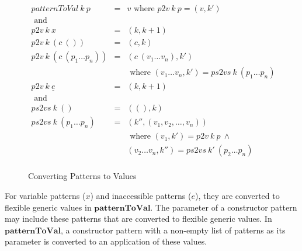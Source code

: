 \documentclass[acmsmall]{acmart}
\begin{document}
\begin{figure}[H]
  \begin{equation*}
    \begin{aligned}
      patternToVal \: k \: p             & = & v \textrm{ where } p2v \: k \: p = (v,k')                           \\
      \textrm{ and }                     &   &                                                                     \\
      p2v \: k \: x                      & = & (k,k+1)                                                             \\
      p2v \: k \: (c \: ())              & = & (c,k)                                                               \\
      p2v \: k \: (c \: (p_1 \dots p_n)) & = & (c \: (v_1 \dots v_n),k')                                           \\ 
                                         &   & \textrm{ where } (v_1 \dots v_n,k') = ps2vs \: k \: (p_1 \dots p_n) \\
      p2v \: k \: \underline{e}          & = & (k,k+1)                                                             \\
      \textrm{ and }                     &   &                                                                     \\
      ps2vs \: k \: ()                   & = & ((),k)                                                              \\
      ps2vs \: k \: (p_1 \dots p_n)      & = & (k'',(v_1,v_2,\dots,v_n))                                           \\
                                         &   & \textrm{ where } (v_1,k') = p2v \: k \: p \: \land                  \\
                                         &   & (v_2 \dots v_n,k'') = ps2vs \: k' \: (p_2 \dots p_n)                \\ 
    \end{aligned}
  \end{equation*}
  \caption{Converting Patterns to Values}
\end{figure}

For variable patterns ($x$) and inaccessible patterns (\underline{$e$}), they are converted to flexible generic values in $\boldsymbol{patternToVal}$. The parameter of a constructor pattern may include these patterns that are converted to flexible generic values. In $\boldsymbol{patternToVal}$, a constructor pattern with a non-empty list of patterns as its parameter is converted to an application of these values.
\end{document}
